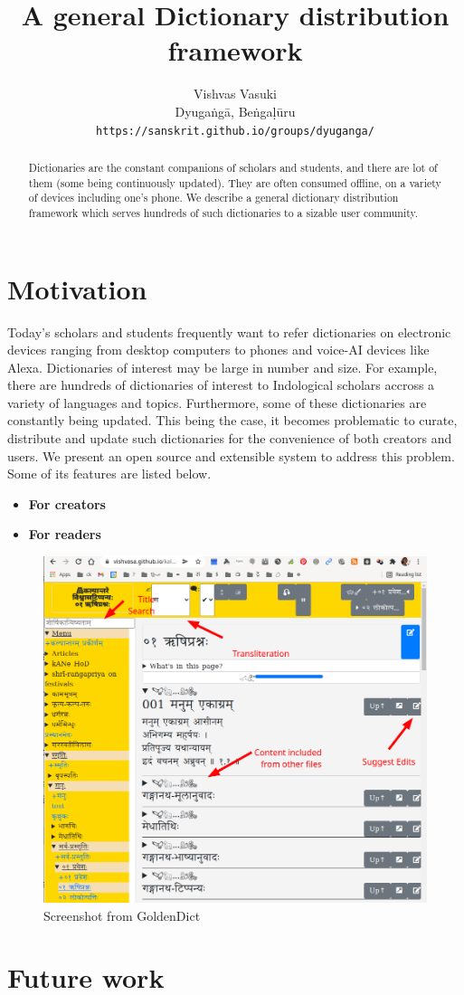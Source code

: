 \documentclass[11pt]{article}
\title{A general Dictionary distribution framework}
\author{
  Vishvas Vasuki \\
  Dyugaṅgā, Beṅgaḷūru \\
  {\tt https://sanskrit.github.io/groups/dyuganga/}
\\}
\date{}
\begin{document}
\maketitle
\begin{abstract}
Dictionaries are the constant companions of scholars and students, and there are lot of them (some being continuously updated). They are often consumed offline, on a variety of devices including one's phone. We describe a general dictionary distribution framework which serves hundreds of such dictionaries to a sizable user community.
\end{abstract}

\section{Motivation}
Today's scholars and students frequently want to refer dictionaries on electronic devices ranging from desktop computers to phones and voice-AI devices like Alexa. Dictionaries of interest may be large in number and size. For example, there are hundreds of dictionaries of interest to Indological scholars accross a variety of languages and topics. Furthermore, some of these dictionaries are constantly being updated. This being the case, it becomes problematic to curate, distribute and update such dictionaries for the convenience of both creators and users. We present an open source and extensible system to address this problem. Some of its features are listed below.

\begin{itemize}
\tightlist
\item \textbf{For creators}
\item \textbf{For readers}
\end{itemize}



\begin{figure}[h]
\caption{Screenshot from GoldenDict}
\centering
\includegraphics[width=1.0\textwidth]{images/kalpAntaram-screenshot}
\end{figure}


\section{Future work}



\end{document}
